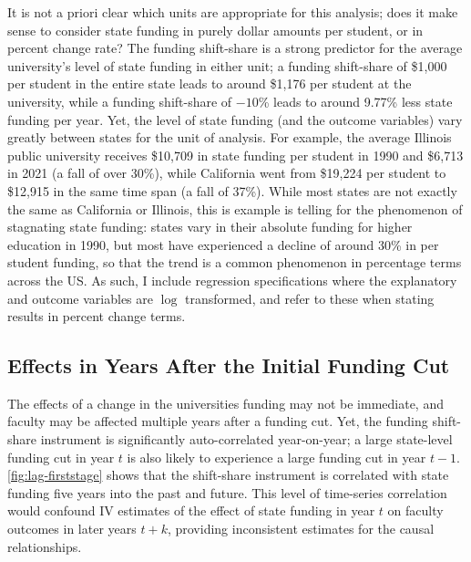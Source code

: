 It is not a priori clear which units are appropriate for this analysis;
does it make sense to consider state funding in purely dollar amounts per student, or in percent change rate?
The funding shift-share is a strong predictor for the average university's level of state funding in either unit; a funding shift-share of \$1,000 per student in the entire state leads to around \$1,176 per student at the university, while a funding shift-share of $-10$\% leads to around 9.77\% less state funding per year.
Yet, the level of state funding (and the outcome variables) vary greatly between states for the unit of analysis.
For example, the average Illinois public university receives \$10,709 in state funding per student in 1990 and  \$6,713 in 2021 (a fall of over 30\%), while California went from \$19,224 per student to \$12,915 in the same time span (a fall of 37\%).
While most states are not exactly the same as California or Illinois, this is example is telling for the phenomenon of stagnating state funding:
states vary in their absolute funding for higher education in 1990, but most have experienced a decline of around 30\% in per student funding, so that the trend is a common phenomenon in percentage terms across the US.
As such, I include regression specifications where the explanatory and outcome variables are $\log$ transformed, and refer to these when stating results in percent change terms.

\subsection{Effects in Years After the Initial Funding Cut}
\label{sec:local-projections}
The effects of a change in the universities funding may not be immediate, and faculty may be affected multiple years after a funding cut.
Yet, the funding shift-share instrument is significantly auto-correlated year-on-year; a large state-level funding cut in year $t$ is also likely to experience a large funding cut in year $t-1$.
\autoref{fig:lag-firststage} shows that the shift-share instrument is correlated with state funding five years into the past and future.
This level of time-series correlation would confound IV estimates of the effect of state funding in year $t$ on faculty outcomes in later years $t+k$, providing inconsistent estimates for the causal relationships.

